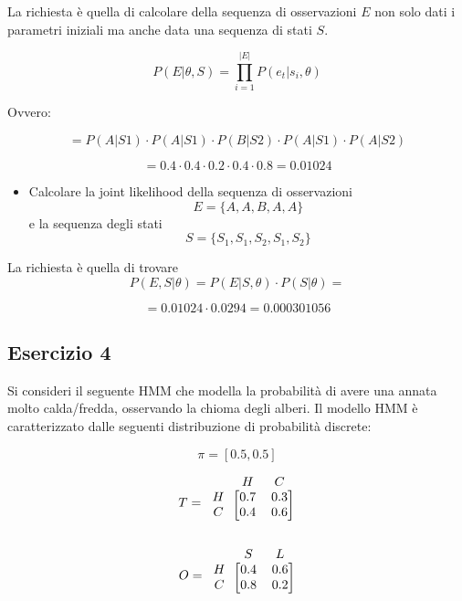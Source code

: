 \documentclass{article}
\begin{document}
La richiesta è quella di calcolare della sequenza di osservazioni $E$ non solo dati i parametri iniziali ma anche data una sequenza di stati $S$.

\[
	P(E | \theta, S) = \prod_{i=1}^{|E|} P(e_{t} | s_i, \theta)
\]

Ovvero:

\[
 = P(A | S1) \cdot P(A | S1) \cdot P(B | S2) \cdot P(A | S1) \cdot P(A | S2)
\]

\[
	= 0.4 \cdot 0.4 \cdot 0.2 \cdot 0.4 \cdot 0.8 = 0.01024
\]

\begin{itemize}
	\item Calcolare la joint likelihood della sequenza di osservazioni 	\[
	E = \{ A, A, B, A, A\}
	\]
	e la sequenza degli stati
	\[
	S = \{ S_1, S_1, S_2, S_1, S_2 \}
	\]
\end{itemize}

La richiesta è quella di trovare
\[
P(E, S | \theta) = P(E | S, \theta) \cdot P(S | \theta) = 
\]

\[
 = 0.01024 \cdot 0.0294 = 0.000301056
\]

\pagebreak

\subsection{Esercizio 4}

Si consideri il seguente HMM che modella la probabilità di avere una annata
molto calda/fredda, osservando la chioma degli alberi. Il modello HMM è
caratterizzato dalle seguenti distribuzione di probabilità discrete:

\[\pi = [0.5, 0.5] \]


\[
T = 
\begin{blockarray}{ccc}
	& H & C \\
	\begin{block}{c[cc]}
		H &	0.7  &  0.3   \\
		C &	0.4  &  0.6   \\
	\end{block}
\end{blockarray}
\]	

\[
O = 
\begin{blockarray}{ccc}
	& S & L \\
	\begin{block}{c[cc]}
		H &	0.4  &  0.6   \\
		C &	0.8  &  0.2   \\
	\end{block}
\end{blockarray}
\]	
\end{document}
